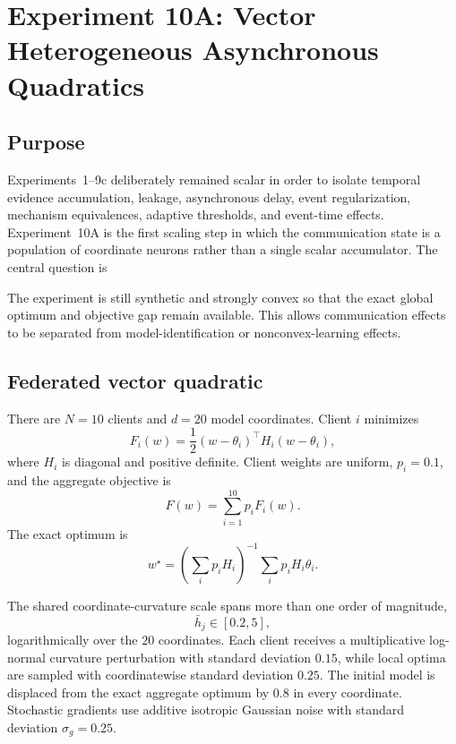 \section{Experiment 10A: Vector Heterogeneous Asynchronous Quadratics}
\label{sec:exp10a}

\subsection{Purpose}

Experiments~1--9c deliberately remained scalar in order to isolate temporal evidence accumulation, leakage, asynchronous delay, event regularization, mechanism equivalences, adaptive thresholds, and event-time effects. Experiment~10A is the first scaling step in which the communication state is a population of coordinate neurons rather than a single scalar accumulator. The central question is
\begin{center}
\end{center}
The experiment is still synthetic and strongly convex so that the exact global optimum and objective gap remain available. This allows communication effects to be separated from model-identification or nonconvex-learning effects.

\subsection{Federated vector quadratic}

There are $N=10$ clients and $d=20$ model coordinates. Client $i$ minimizes
\begin{equation}
  F_i(w)=\frac{1}{2}(w-\theta_i)^\top H_i(w-\theta_i),
\end{equation}
where $H_i$ is diagonal and positive definite. Client weights are uniform, $p_i=0.1$, and the aggregate objective is
\begin{equation}
  F(w)=\sum_{i=1}^{10}p_iF_i(w).
\end{equation}
The exact optimum is
\begin{equation}
  w^\star=\left(\sum_i p_iH_i\right)^{-1}\sum_i p_iH_i\theta_i.
\end{equation}

The shared coordinate-curvature scale spans more than one order of magnitude,
\begin{equation}
  \bar h_j\in[0.2,5],
\end{equation}
logarithmically over the $20$ coordinates. Each client receives a multiplicative log-normal curvature perturbation with standard deviation $0.15$, while local optima are sampled with coordinatewise standard deviation $0.25$. The initial model is displaced from the exact aggregate optimum by $0.8$ in every coordinate. Stochastic gradients use additive isotropic Gaussian noise with standard deviation $\sigma_g=0.25$.

